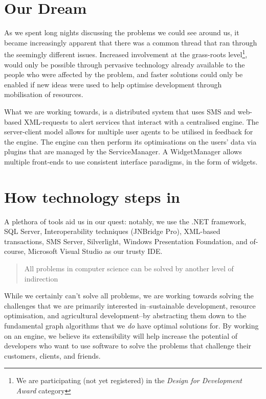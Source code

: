\documentclass{report}
\begin{document}
\section*{Our Dream}
As we spent long nights discussing the problems we could see around us, it became increasingly apparent that there was a common thread that ran through the seemingly different issues.  Increased involvement at the grass-roots level\footnote{We are participating (not yet registered) in the \emph{Design for Development Award} category}, would only be possible through pervasive technology already available to the people who were affected by the problem, and faster solutions could only be enabled if new ideas were used to help optimise development through mobilisation of resources.

What we are working towards, is a distributed system that uses SMS and web-based XML-requests to alert services that interact with a centralised engine.  The server-client model allows for multiple user agents to be utilised in feedback for the engine.  The engine can then perform its optimisations on the users' data via plugins that are managed by the ServiceManager.  A WidgetManager allows multiple front-ends to use consistent interface paradigms, in the form of widgets.

\section*{How technology steps in}
A plethora of tools aid us in our quest: notably, we use the .NET framework, SQL Server, Interoperability techniques (JNBridge Pro), XML-based transactions, SMS Server, Silverlight, Windows Presentation Foundation, and of-course, Microsoft Visual Studio as our trusty IDE.

\begin{quote}
All problems in computer science can be solved by another level of indirection
\end{quote}

While we certainly can't solve all problems, we are working towards solving the challenges that we are primarily interested in--sustainable development, resource optimisation, and agricultural development--by abstracting them down to the fundamental graph algorithms that we \emph{do} have optimal solutions for.  By working on an engine, we believe its extensibility will help increase the potential of developers who want to use software to solve the problems that challenge their customers, clients, and friends.
\end{document}

